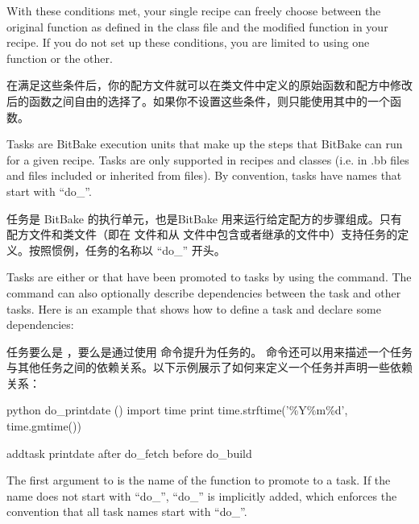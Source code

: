 With these conditions met, your single recipe can freely choose between the original function as defined in the class file and the modified function in your recipe. If you do not set up these conditions, you are limited to using one function or the other.

在满足这些条件后，你的配方文件就可以在类文件中定义的原始函数和配方中修改后的函数之间自由的选择了。如果你不设置这些条件，则只能使用其中的一个函数。

\label{section:Tasks}

Tasks are BitBake execution units that make up the steps that BitBake can run for a given recipe. Tasks are only supported in recipes and classes (i.e. in .bb files and files included or inherited from  files). By convention, tasks have names that start with ``do\_''.

任务是 BitBake 的执行单元，也是BitBake 用来运行给定配方的步骤组成。只有配方文件和类文件（即在  文件和从  文件中包含或者继承的文件中）支持任务的定义。按照惯例，任务的名称以 ``do\_'' 开头。


Tasks are either  or  that have been promoted to tasks by using the  command. The  command can also optionally describe dependencies between the task and other tasks. Here is an example that shows how to define a task and declare some dependencies:

任务要么是 ，要么是通过使用  命令提升为任务的。 命令还可以用来描述一个任务与其他任务之间的依赖关系。以下示例展示了如何来定义一个任务并声明一些依赖关系：

\begin{pyglist}
python do_printdate () {
    import time
    print time.strftime('\%Y\%m\%d', time.gmtime())
}

addtask printdate after do_fetch before do_build
\end{pyglist}

The first argument to  is the name of the function to promote to a task. If the name does not start with ``do\_'', ``do\_'' is implicitly added, which enforces the convention that all task names start with ``do\_''.


